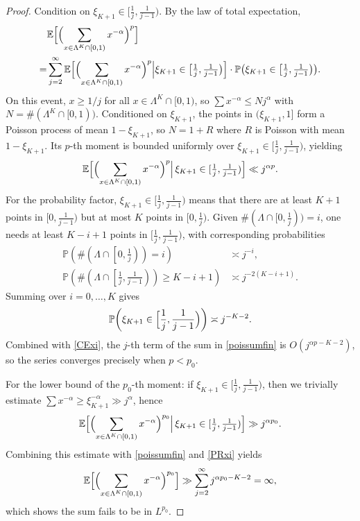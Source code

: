 \documentclass[11pt,twoside,a4paper,reqno]{amsart}
\renewcommand{\P}{\mathbb{P}}
\begin{document}
\begin{proof}
Condition on $\xi_{K+1}\in[\frac1j,\frac1{j-1})$. By the law of total expectation,
\begin{equation}\label{poissumfin}
\begin{aligned}
&\mathbb{E}\Bigl[\Bigl(\sum_{x\in\Lambda^K\cap[0,1)} x^{-\alpha}\Bigr)^p\Bigr]\\
= &\sum_{j=2}^{\infty}\mathbb{E}\Bigl[\Bigl(\sum_{x\in\Lambda^K\cap[0,1)} x^{-\alpha}\Bigr)^p
\Big|\xi_{K+1}\in\bigl[\tfrac1j,\tfrac1{j-1}\bigr)\Bigr]
\cdot \mathbb{P}\bigl(\xi_{K+1}\in\bigl[\tfrac1j,\tfrac1{j-1}\bigr)\bigr).
\end{aligned}
\end{equation}
On this event, $x\ge 1/j$ for all $x\in\Lambda^K\cap[0,1)$, so $\sum x^{-\alpha}\le N j^\alpha$ with $N=\#(\Lambda^K\cap[0,1))$. Conditioned on $\xi_{K+1}$, the points in $(\xi_{K+1},1]$ form a Poisson process of mean $1-\xi_{K+1}$, so $N=1+R$ where $R$ is Poisson with mean $1-\xi_{K+1}$. Its $p$-th moment is bounded uniformly over $\xi_{K+1}\in[\tfrac1j,\tfrac1{j-1})$, yielding
\begin{equation}\label{CExi}
\mathbb{E}\Bigl[\Bigl(\sum_{x\in\Lambda^K\cap[0,1)}x^{-\alpha}\Bigr)^p \Big|\,\xi_{K+1}\in[\tfrac1j,\tfrac1{j-1})\Bigr]
\ll j^{\alpha p}.
\end{equation}
For the probability factor, $\xi_{K+1}\in[\frac1j,\frac1{j-1})$ means that there are at least $K+1$ points in $\bigl[0,\frac{1}{j-1}\bigr)$ but at most $K$ points in $\bigl[0,\frac{1}{j}\bigr)$. Given $\#(\Lambda\cap[0,\frac{1}{j}))=i$, one needs at least $K-i+1$ points in $[\frac{1}{j},\frac{1}{j-1})$, with corresponding probabilities
\begin{align*}
\P\left(\#\left(\Lambda\cap\left[0,\frac{1}{j}\right)\right)=i\right)&\asymp j^{-i},\\
\P\left(\#\left(\Lambda\cap\left[\frac{1}{j},\frac{1}{j-1}\right)\right)\geq K-i+1\right) &\asymp j^{-2(K-i+1)}.
\end{align*}
Summing over $i=0,\dots,K$ gives
\begin{equation}\label{PRxi}
\mathbb{P}\biggl(\xi_{K+1}\in\Bigl[\frac{1}{j},\frac{1}{j-1}\Bigr)\biggr)\asymp j^{-K-2}.
\end{equation}
Combined with \eqref{CExi}, the $j$-th term of the sum in \eqref{poissumfin} is $O(j^{\alpha p-K-2})$, so the series converges precisely when $p<p_0$.



For the lower bound of the $p_0$-th moment: if $\xi_{K+1}\in[\frac1j,\frac1{j-1})$, then we trivially estimate $\sum x^{-\alpha} \ge \xi_{K+1}^{-\alpha} \gg j^{\alpha}$, hence
\begin{equation*}
\mathbb{E}\Bigl[\Bigl(\sum_{x\in\Lambda^K\cap[0,1)}x^{-\alpha}\Bigr)^{p_0} \Big|\,\xi_{K+1}\in[\tfrac1j,\tfrac1{j-1})\Bigr]
\gg j^{\alpha p_0}.
\end{equation*}
Combining this estimate with \eqref{poissumfin} and \eqref{PRxi} yields
$$
\mathbb{E}\Bigl[\Bigl(\sum_{x\in\Lambda^K\cap[0,1)}x^{-\alpha}\Bigr)^{p_0}\Bigr]
\gg\sum_{j=2}^\infty j^{\alpha p_0-K-2}=\infty,
$$
which shows the sum fails to be in $L^{p_0}$.


\end{proof}
\end{document}
